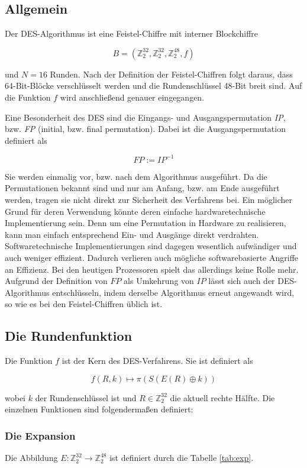 \documentclass[
10pt, %
a4paper, %
oneside, %
headinclude,footinclude, %
BCOR5mm, %
]{scrartcl}
\begin{document}
	\subsection{Allgemein}
	Der DES-Algorithmus ist eine Feistel-Chiffre mit interner Blockchiffre 
	
	$$ B = (\mathbb{Z}^{32}_2 , \mathbb{Z}^{32}_2 , \mathbb{Z}^{48}_2, f) $$
	
	und $ N = 16 $ Runden.\cite[51-52]{2} Nach der Definition der Feistel-Chiffren folgt daraus, dass 64-Bit-Blöcke verschlüsselt werden und die Rundenschlüssel 48-Bit breit sind. Auf die Funktion $f$ wird anschließend genauer eingegangen.

	Eine Besonderheit des DES sind die Eingangs- und Ausgangspermutation \emph{IP}, bzw. \emph{FP} (initial, bzw. final permutation). Dabei ist die Ausgangspermutation definiert als

	$$ FP := IP^{-1} $$
	
	Sie werden einmalig vor, bzw. nach dem Algorithmus ausgeführt. Da die Permutationen bekannt sind und nur am Anfang, bzw. am Ende ausgeführt werden, tragen sie nicht direkt zur Sicherheit des Verfahrens bei. Ein möglicher Grund für deren Verwendung könnte deren einfache hardwaretechnische Implementierung sein. Denn um eine Permutation in Hardware zu realisieren, kann man einfach entsprechend Ein- und Ausgänge direkt verdrahten. Softwaretechnische Implementierungen sind dagegen wesentlich aufwändiger und auch weniger effizient. Dadurch verlieren auch mögliche softwarebasierte Angriffe an Effizienz. Bei den heutigen Prozessoren spielt das allerdings keine Rolle mehr. 	
	Aufgrund der Definition von $FP$ als Umkehrung von $IP$ lässt sich auch der DES-Algorithmus entschlüsseln, indem derselbe Algorithmus erneut angewandt wird, so wie es bei den Feistel-Chiffren üblich ist.
	
	\subsection{Die Rundenfunktion}
	Die Funktion $f$ ist der Kern des DES-Verfahrens. Sie ist definiert als
	
	$$ f(R,k) \mapsto \pi (S(E(R) \oplus k)) $$
	
	wobei $k$ der Rundenschlüssel ist und $R \in \mathbb{Z}^{32}_2$ die aktuell rechte Hälfte. \cite[52]{2} Die einzelnen Funktionen sind folgendermaßen definiert:

	\subsubsection{Die Expansion}
	Die Abbildung $ E: \mathbb{Z}^{32}_2 \rightarrow \mathbb{Z}^{48}_2 $ ist 
definiert durch die Tabelle \ref{tab:exp}.
	
\end{document}
